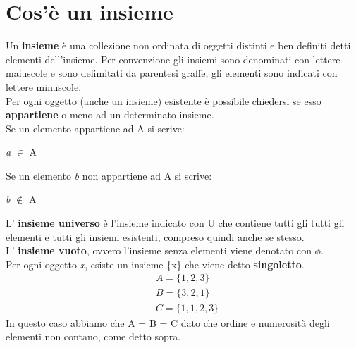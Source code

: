 \section{Cos'è un insieme}

Un \textbf{insieme} è una collezione non ordinata di oggetti distinti e ben definiti detti elementi dell'insieme.
Per convenzione gli insiemi sono denominati con lettere maiuscole e sono delimitati da parentesi graffe, gli elementi sono indicati con lettere minuscole. \\
Per ogni oggetto (anche un insieme) esistente è possibile chiedersi se esso \textbf{appartiene} o meno ad un determinato insieme. \\
Se un elemento appartiene ad A si scrive:
\begin{center}
    \textit{a} $\in$ A
\end{center}
Se un elemento \textit{b} non appartiene ad A si scrive:
\begin{center}
    \textit{b} $\notin$ A
\end{center}
L' \textbf{insieme universo} è l'insieme indicato con U che contiene tutti gli tutti gli elementi e tutti gli insiemi esistenti, compreso quindi anche se stesso. \\
L' \textbf{insieme vuoto}, ovvero l'insieme senza elementi viene denotato con $\phi$. \\
Per ogni oggetto \textit{x}, esiste un insieme \{x\} che viene detto \textbf{singoletto}.
\begin{align*}
    &A = \{1, 2, 3\} \\
    &B = \{3, 2, 1\} \\
    &C = \{1, 1, 2, 3\}
\end{align*}
In questo caso abbiamo che A = B = C dato che ordine e numerosità degli elementi non contano, come detto sopra. \\

